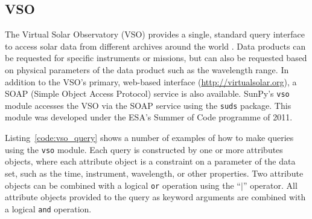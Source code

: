 \subsection{VSO}\label{ssec:vso}

The Virtual Solar Observatory (VSO) provides a single, standard query
interface to access solar data from different archives around the world
 \cite{hill2009}.
Data products can be requested for specific instruments or missions, but
can also be requested based on physical parameters of the data product such
as the wavelength range.
In addition to the VSO's primary, web-based interface
(\url{http://virtualsolar.org}), a SOAP (Simple Object Access Protocol)
service is also available.
SunPy's \texttt{vso} module accesses the VSO via the SOAP service using the
\texttt{suds} package.
This module was developed under the ESA's Summer of Code programme of 2011.

Listing~\ref{code:vso_query} shows a number of examples of how to make queries
using the \texttt{vso} module.
Each query is constructed by one or more attributes objects, where each
attribute object is a constraint on a parameter of the data set, such as the
time, instrument, wavelength, or  other properties.
Two attribute objects can be combined with a logical \texttt{or} operation
using the ``$|$'' operator.
All attribute objects provided to the query as keyword arguments are combined
with a logical \texttt{and} operation.

